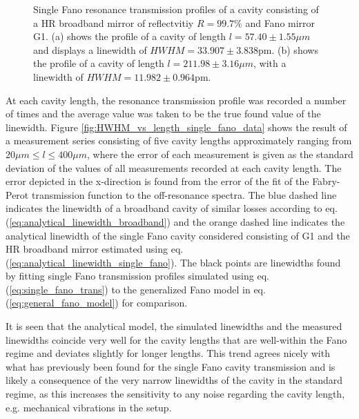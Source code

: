 \begin{figure}[h!]
\begin{subfigure}[b]{0.49\textwidth}
        \caption{}
        \label{fig:long_single_fano_trans}
    \end{subfigure}
    \caption{Single Fano resonance transmission profiles of a cavity consisting of a HR broadband mirror of reflectvitiy $R=99.7\%$ and Fano mirror G1. (a) shows the profile of a cavity of length $l = 57.40 \pm 1.55 \mu m$ and displays a linewidth of $HWHM = 33.907 \pm 3.838$pm. (b) shows the profile of a cavity of length $l = 211.98 \pm 3.16 \mu m$, with a linewidth of $HWHM = 11.982 \pm 0.964$pm.}
    \label{fig:M5/G1_single_fano_trans_examples}
\end{figure}

At each cavity length, the resonance transmission profile was recorded a number of times and the average value was taken to be the true found value of the linewidth. Figure \ref{fig:HWHM_vs_length_single_fano_data} shows the result of a measurement series consisting of five cavity lengths approximately ranging from $20\mu m \leq l \leq 400 \mu m$, where the error of each measurement is given as the standard deviation of the values of all measurements recorded at each cavity length\cite{Hughes}. The error depicted in the x-direction is found from the error of the fit of the Fabry-Perot transmission function to the off-resonance spectra. The blue dashed line indicates the linewidth of a broadband cavity of similar losses according to eq. (\ref{eq:analytical_linewidth_broadband}) and the orange dashed line indicates the analytical linewidth of the single Fano cavity considered consisting of G1 and the HR broadband mirror estimated using eq. (\ref{eq:analytical_linewidth_single_fano}). The black points are linewidths found by fitting single Fano transmission profiles simulated using eq. (\ref{eq:single_fano_trans}) to the generalized Fano model in eq. (\ref{eq:general_fano_model}) for comparison. 

It is seen that the analytical model, the simulated linewidths and the measured linewidths coincide very well for the cavity lengths that are well-within the Fano regime and deviates slightly for longer lengths. This trend agrees nicely with what has previously been found for the single Fano cavity transmission\cite{Mitra} and is likely a consequence of the very narrow linewidths of the cavity in the standard regime, as this increases the sensitivity to any noise regarding the cavity length, e.g. mechanical vibrations in the setup.

